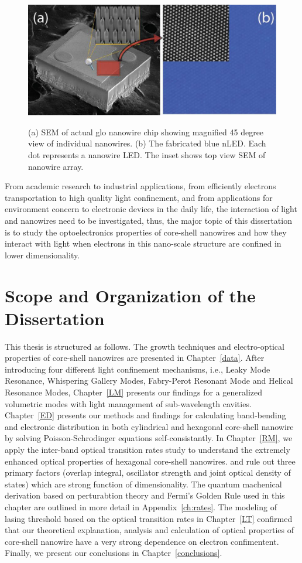 \begin{figure}
  \caption{(a) SEM of actual glo nanowire chip showing magnified 45 degree view of  individual nanowires. (b) The fabricated blue nLED. Each dot represents a nanowire LED. The inset shows top view SEM of nanowire array.}
  \centering
  \includegraphics[width=\textwidth]{pictures/Introduction/GloLED}
  \label{GloLED}
\end{figure}

From academic research to industrial applications, from efficiently electrons
transportation to high quality light confinement, and from applications for
environment concern to electronic devices in the daily life, the interaction of
light and nanowires need to be investigated, thus, the major topic of this
dissertation is to study the optoelectronics properties of core-shell nanowires
and how they interact with light when electrons in this nano-scale structure
are confined in lower dimensionality.

\section{Scope and Organization of the Dissertation}

This thesis is structured as follows. The growth techniques and electro-optical
properties of core-shell nanowires are presented in Chapter~\ref{data}.  After
introducing four different light confinement mechanisms, i.e., Leaky Mode
Resonance, Whispering Gallery Modes, Fabry-Perot Resonant Mode and Helical
Resonance Modes, Chapter~\ref{LM} presents our findings for a generalized
volumetric modes with light management of sub-wavelength cavities.
Chapter~\ref{ED} presents our methods and findings for calculating band-bending
and electronic distribution in both cylindrical and hexagonal core-shell
nanowire by solving Poisson-Schrodinger equations self-consistantly.  In
Chapter~\ref{RM}, we apply the inter-band optical transition rates study to
understand the extremely enhanced optical properties of hexagonal core-shell
nanowires. and rule out three primary factors (overlap integral, oscillator
strength and joint optical density of states) which are strong function of
dimensionality.  The quantum machenical derivation based on perturabtion theory
and Fermi's Golden Rule used in this chapter are outlined in more detail in
Appendix~\ref{ch:rates}. The modeling of lasing threshold based on the optical
transition rates in Chapter~\ref{LT} confirmed that our theoretical
explanation, analysis and calculation of optical properties of core-shell
nanowire have a very strong dependence on electron confimentent. Finally, we
present our conclusions in Chapter~\ref{conclusions}. 


